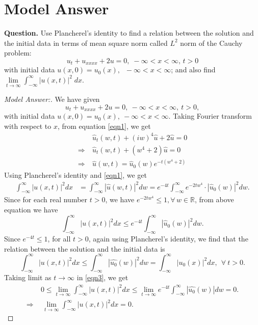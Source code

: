 \documentclass[12pt,leqno]{amsart}
\newcommand{\bb}[1]{\mathbb{#1}}
\numberwithin{equation}{section}
\theoremstyle{definition}
\begin{document}
\date{\today}

\baselineskip=16pt
\section{Model Answer}
\noindent
{\bf Question.} 
Use Plancherel's identity to find a relation between the solution and the initial data 
in terms of mean square norm called \(L^2\) norm of the Cauchy problem: 
$$u_t+u_{xxxx} +2u=0,\;-\infty < x < \infty,\, t>0$$ 
with initial data \(u(x,0)=u_0(x),\;\; -\infty < x < \infty\); and also find 
$\lim\limits_{t\to\infty} \int_{-\infty}^{\infty} |u(x,t)|^2\;dx$.

\begin{proof}[Model Answer:]
We have given 
\begin{equation}\label{eqn1}
u_t + u_{xxxx} + 2u = 0,\ -\infty < x < \infty,\ t > 0, 
\end{equation}
with initial data $u(x, 0) = u_0(x),\ -\infty < x < \infty$. 
Taking Fourier transform with respect to $x$, from equation \eqref{eqn1}, we get 
\begin{align}
&\ \widehat{u}_t(w, t) + (iw)^4\widehat{u} + 2\widehat{u} = 0 \nonumber \\
\Longrightarrow &\ \widehat{u}_t(w, t) + (w^4+2)\widehat{u} = 0 \nonumber \\ 
\Longrightarrow &\ \widehat{u}(w, t) = \widehat{u}_0(w) e^{-t(w^4+2)} \label{eqn2}
\end{align}
Using Plancherel's identity and \eqref{eqn1}, we get 
\begin{align*}
\int_{-\infty}^\infty |u(x, t)|^2 dx & = \int_{-\infty}^\infty |\widehat{u}(w, t)|^2 dw 
= e^{-4t} \int_{-\infty}^\infty e^{-2tw^4}\cdot |\widehat{u}_0(w)|^2dw. %
\end{align*}
Since for each real number $t > 0$, we have $e^{-2tw^4} \leq 1, \forall\, w \in \bb R$, from above equation we have 
\begin{equation}\label{eqn3}
	\int_{-\infty}^\infty |u(x, t)|^2 dx \leq e^{-4t} \int_{-\infty}^\infty |\widehat{u}_0(w)|^2 dw. 
\end{equation}
Since $e^{-4t} \leq 1$, for all $t > 0$, again using Plancherel's identity, 
we find that the relation between the solution and the initial data is 
$$\int_{-\infty}^{\infty} |u(x,t)|^2 dx 
\leq \int_{-\infty}^{\infty} |\widehat{u_0}(w)|^2 dw 
= \int_{-\infty}^\infty |u_0(x)|^2 dx,\ \ \forall\ t > 0.$$ 
Taking limit as $t \to \infty$ in \eqref{eqn3}, we get 
\begin{align}
	& \ 0 \leq \lim\limits_{t\to\infty} \int_{-\infty}^{\infty} |u(x, t)|^2 dx 
	\leq \lim\limits_{t\to\infty} e^{-4t}\int_{-\infty}^{\infty} |\widehat{u_0}(w)| dw = 0. \nonumber \\ 
	\Longrightarrow & \ \ \lim\limits_{t\to\infty} \int_{-\infty}^{\infty} |u(x, t)|^2 dx  = 0. \nonumber
\end{align}
\end{proof}


\date{\today}
\end{document}
